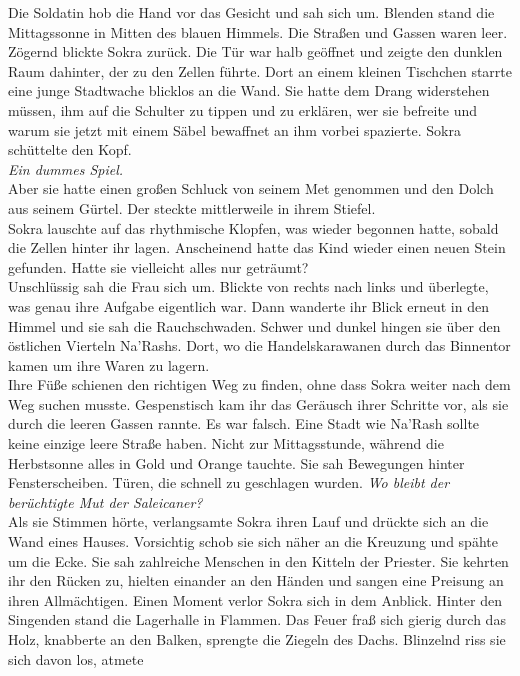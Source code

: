 Die Soldatin hob die Hand vor das Gesicht und sah sich um. Blenden stand die Mittagssonne in Mitten 
des blauen Himmels. Die Straßen und Gassen waren leer. Zögernd blickte Sokra zurück. Die Tür war 
halb geöffnet und zeigte den dunklen Raum dahinter, der zu den Zellen führte. Dort an einem kleinen 
Tischchen starrte eine junge Stadtwache blicklos an die Wand. Sie hatte dem Drang widerstehen 
müssen, ihm auf die Schulter zu tippen und zu erklären, wer sie befreite und warum sie jetzt mit 
einem Säbel bewaffnet an ihm vorbei spazierte. Sokra schüttelte den Kopf.\\
\textit{Ein dummes Spiel.}\\
Aber sie hatte einen großen Schluck von seinem Met genommen und den Dolch aus seinem Gürtel. Der 
steckte mittlerweile in ihrem Stiefel.\\
Sokra lauschte auf das rhythmische Klopfen, was wieder begonnen hatte, sobald die Zellen hinter ihr 
lagen. Anscheinend hatte das Kind wieder einen neuen Stein gefunden. Hatte sie vielleicht alles nur 
geträumt?\\
Unschlüssig sah die Frau sich um. Blickte von rechts nach links und überlegte, was genau ihre 
Aufgabe eigentlich war. Dann wanderte ihr Blick erneut in den Himmel und sie sah die Rauchschwaden. 
Schwer und dunkel hingen sie über den östlichen Vierteln Na'Rashs. Dort, wo die Handelskarawanen 
durch das Binnentor kamen um ihre Waren zu lagern.\\
Ihre Füße schienen den richtigen Weg zu finden, ohne dass Sokra weiter nach dem Weg suchen musste. 
Gespenstisch kam ihr das Geräusch ihrer Schritte vor, als sie durch die leeren Gassen rannte. Es 
war falsch. Eine Stadt wie Na'Rash sollte keine einzige leere Straße haben. Nicht zur 
Mittagsstunde, während die Herbstsonne alles in Gold und Orange tauchte. Sie sah Bewegungen hinter 
Fensterscheiben. Türen, die schnell zu geschlagen wurden. \textit{Wo bleibt der berüchtigte Mut der 
Saleicaner?}\\
Als sie Stimmen hörte, verlangsamte Sokra ihren Lauf und drückte sich an die Wand eines Hauses. 
Vorsichtig schob sie sich näher an die Kreuzung und spähte um die Ecke. Sie sah zahlreiche Menschen 
in den Kitteln der Priester. Sie kehrten ihr den Rücken zu, hielten einander an den Händen und 
sangen eine Preisung an ihren Allmächtigen. Einen Moment verlor Sokra sich in dem Anblick. Hinter 
den Singenden stand die Lagerhalle in Flammen. Das Feuer fraß sich gierig durch das Holz, knabberte 
an den Balken, sprengte die Ziegeln des Dachs. Blinzelnd riss sie sich davon los, atmete 
